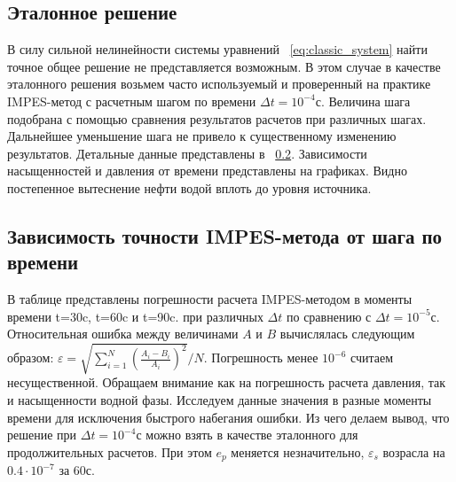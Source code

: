 \subsection{Эталонное решение}
\label{reference sample}
В силу сильной нелинейности системы уравнений ~\ref{eq:classic_system} найти точное общее решение не представляется возможным.
В этом случае в качестве эталонного решения возьмем часто используемый и проверенный на практике IMPES-метод с расчетным шагом по
времени $\Delta t = 10^{-4}\text{с}$. Величина шага подобрана с помощью сравнения результатов расчетов при различных шагах.
Дальнейшее уменьшение шага не привело к существенному изменению результатов. Детальные данные представлены в ~\ref{time_step_impes_cor}.
Зависимости насыщенностей и давления от времени представлены на графиках. Видно постепенное вытеснение нефти водой вплоть до уровня источника.

\subsection{Зависимость точности IMPES-метода от шага по времени}
\label{time_step_impes_cor}
В таблице представлены погрешности расчета IMPES-методом в моменты времени t=30c, t=60c и t=90c. 
при различных $\Delta t$ по сравнению с $\Delta t = 10^{-5}\text{с}$.
Относительная ошибка между величинами $A$ и $B$ вычислялась следующим образом: $\varepsilon=\sqrt{\sum\limits_{i=1}^N\left({\frac{A_i-B_i}{A_i}}\right)^2} / N$.
Погрешность менее $10^{-6}$ считаем несущественной. Обращаем внимание как на погрешность расчета давления, так и насыщенности водной фазы.
Исследуем данные значения в разные моменты времени для исключения быстрого набегания ошибки.
Из чего делаем вывод, что решение при $\Delta t = 10^{-4}\text{с}$
можно взять в качестве эталонного для продолжительных расчетов. При этом $e_p$ меняется незначительно, $\varepsilon_s$ возрасла на $0.4 \cdot 10^{-7}$  за 60с.

